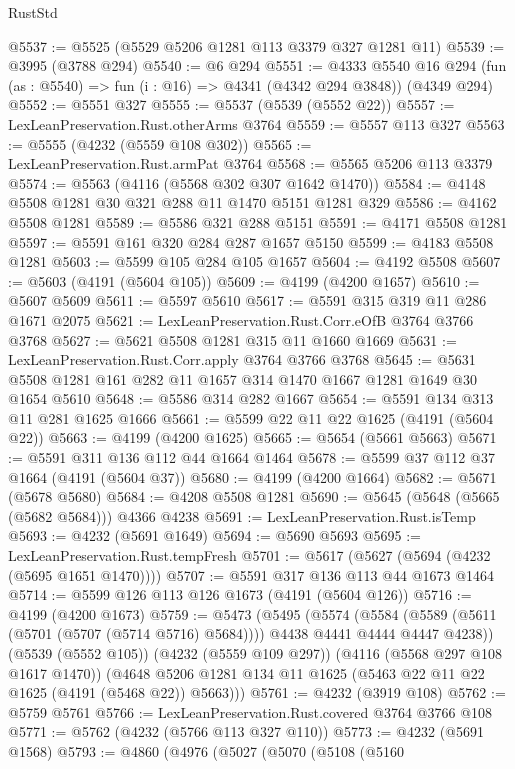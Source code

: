 \begin{lexlean}{RustStd}
\begin{coremodule}
@5537 := @5525 (@5529 @5206 @1281 @113 @3379 @327 @1281 @11)
@5539 := @3995 (@3788 @294)
@5540 := @6 @294
@5551 := @4333
    @5540
    @16
    @294
    (fun (as : @5540) => fun (i : @16) => @4341 (@4342 @294 @3848))
    (@4349 @294)
@5552 := @5551 @327
@5555 := @5537 (@5539 (@5552 @22))
@5557 := LexLeanPreservation.Rust.otherArms @3764
@5559 := @5557 @113 @327
@5563 := @5555 (@4232 (@5559 @108 @302))
@5565 := LexLeanPreservation.Rust.armPat @3764
@5568 := @5565 @5206 @113 @3379
@5574 := @5563 (@4116 (@5568 @302 @307 @1642 @1470))
@5584 := @4148 @5508 @1281 @30 @321 @288 @11 @1470 @5151 @1281 @329
@5586 := @4162 @5508 @1281
@5589 := @5586 @321 @288 @5151
@5591 := @4171 @5508 @1281
@5597 := @5591 @161 @320 @284 @287 @1657 @5150
@5599 := @4183 @5508 @1281
@5603 := @5599 @105 @284 @105 @1657
@5604 := @4192 @5508
@5607 := @5603 (@4191 (@5604 @105))
@5609 := @4199 (@4200 @1657)
@5610 := @5607 @5609
@5611 := @5597 @5610
@5617 := @5591 @315 @319 @11 @286 @1671 @2075
@5621 := LexLeanPreservation.Rust.Corr.eOfB @3764 @3766 @3768
@5627 := @5621 @5508 @1281 @315 @11 @1660 @1669
@5631 := LexLeanPreservation.Rust.Corr.apply @3764 @3766 @3768
@5645 := @5631 @5508 @1281 @161 @282 @11 @1657 @314 @1470 @1667 @1281 @1649 @30 @1654 @5610
@5648 := @5586 @314 @282 @1667
@5654 := @5591 @134 @313 @11 @281 @1625 @1666
@5661 := @5599 @22 @11 @22 @1625 (@4191 (@5604 @22))
@5663 := @4199 (@4200 @1625)
@5665 := @5654 (@5661 @5663)
@5671 := @5591 @311 @136 @112 @44 @1664 @1464
@5678 := @5599 @37 @112 @37 @1664 (@4191 (@5604 @37))
@5680 := @4199 (@4200 @1664)
@5682 := @5671 (@5678 @5680)
@5684 := @4208 @5508 @1281
@5690 := @5645 (@5648 (@5665 (@5682 @5684))) @4366 @4238
@5691 := LexLeanPreservation.Rust.isTemp
@5693 := @4232 (@5691 @1649)
@5694 := @5690 @5693
@5695 := LexLeanPreservation.Rust.tempFresh
@5701 := @5617 (@5627 (@5694 (@4232 (@5695 @1651 @1470))))
@5707 := @5591 @317 @136 @113 @44 @1673 @1464
@5714 := @5599 @126 @113 @126 @1673 (@4191 (@5604 @126))
@5716 := @4199 (@4200 @1673)
@5759 := @5473
    (@5495
      (@5574
        (@5584 (@5589 (@5611 (@5701 (@5707 (@5714 @5716) @5684)))) @4438 @4441 @4444 @4447 @4238))
      (@5539 (@5552 @105))
      (@4232 (@5559 @109 @297))
      (@4116 (@5568 @297 @108 @1617 @1470))
      (@4648 @5206 @1281 @134 @11 @1625 (@5463 @22 @11 @22 @1625 (@4191 (@5468 @22)) @5663)))
@5761 := @4232 (@3919 @108)
@5762 := @5759 @5761
@5766 := LexLeanPreservation.Rust.covered @3764 @3766 @108
@5771 := @5762 (@4232 (@5766 @113 @327 @110))
@5773 := @4232 (@5691 @1568)
@5793 := @4860
    (@4976
      (@5027
        (@5070
          (@5108
            (@5160

\end{coremodule}
\end{lexlean}
